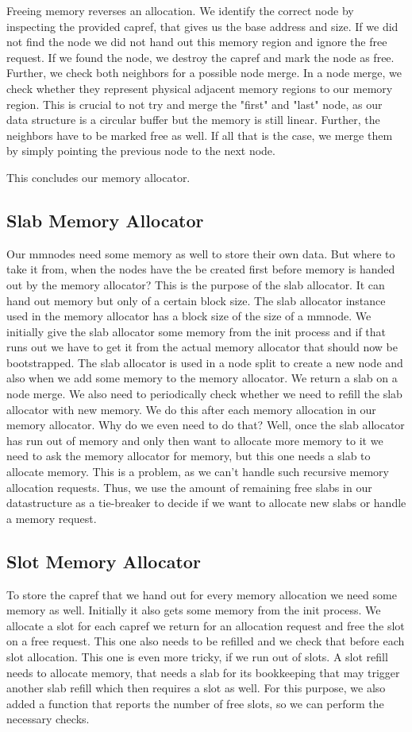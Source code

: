 Freeing memory reverses an allocation. We identify the correct node by
inspecting the provided capref, that gives us the base address and size.  If we
did not find the node we did not hand out this memory region and ignore the free
request. If we found the node, we destroy the capref and mark the node as
free. Further, we check both neighbors for a possible node merge. In a node
merge, we check whether they represent physical adjacent memory regions to
our memory region. This is crucial to not try and merge the "first" and "last"
node, as our data structure is a circular buffer but the memory is still linear.
Further, the neighbors have to be marked free as well. If all that is the case, we
merge them by simply pointing the previous node to the next node.

This concludes our memory allocator.

\subsection{Slab Memory Allocator}
Our mmnodes need some memory as well to store their own data. But where to take it from,
when the nodes have the be created first before memory is handed out by the
memory allocator? This is the purpose of the slab allocator. It can hand out
memory but only of a certain block size. The slab allocator instance used in
the memory allocator has a block size of the size of a mmnode. We initially give
the slab allocator some memory from the init process and if that runs out we
have to get it from the actual memory allocator that should now be bootstrapped.
The slab allocator is used in a node split to create a new node and also when we
add some memory to the memory allocator. We return a slab on a node merge. We
also need to periodically check whether we need to refill the slab allocator
with new memory. We do this after each memory allocation in our memory
allocator.  Why do we even need to do that?  Well, once the slab allocator has
run out of memory and only then want to allocate more memory to it we need to
ask the memory allocator for memory, but this one needs a slab to allocate
memory. This is a problem, as we can't handle such recursive memory allocation requests.
Thus, we use the amount of remaining free slabs in our datastructure 
as a tie-breaker to decide if we want to allocate new slabs or handle a memory request.

\subsection{Slot Memory Allocator}
To store the capref that we hand out for every memory allocation we need some memory
as well. Initially it also gets some memory from the init process. We allocate
a slot for each capref we return for an allocation request and free the slot on
a free request.  This one also needs to be refilled and we check that
before each slot allocation. This one is even more tricky, if we run out of
slots. A slot refill needs to allocate memory, that needs a slab for its
bookkeeping that may trigger another slab refill which then requires a slot as well. For
this purpose, we also added a function that reports the number of free slots,
so we can perform the necessary checks.

